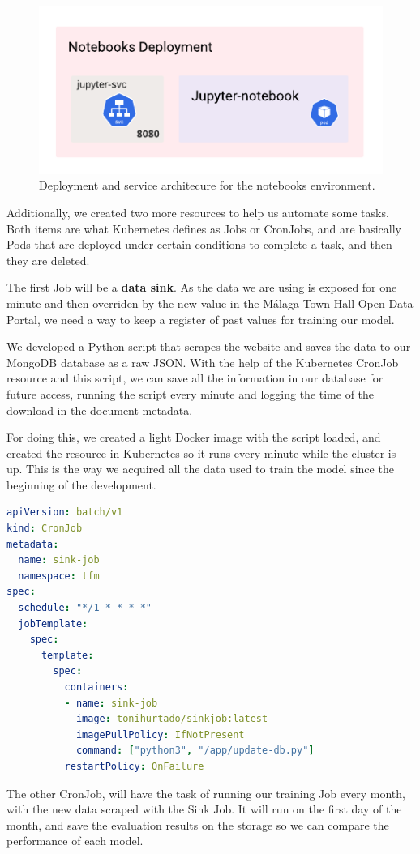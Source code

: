 \begin{figure}[H]
	\centering
	\includegraphics[width=0.6\linewidth]{imagenes/diagram-jupyter.png}
	\caption{Deployment and service architecure for the notebooks environment.}
	\label{diagram-jupyter}
\end{figure}

Additionally, we created two more resources to help us automate some tasks. Both items are what Kubernetes defines as Jobs or CronJobs, and are basically Pods that are deployed under certain conditions to complete a task, and then they are deleted.

The first Job will be a \textbf{data sink}. As the data we are using is exposed for one minute and then overriden by the new value in the Málaga Town Hall Open Data Portal, we need a way to keep a register of past values for training our model. 

We developed a Python script that scrapes the website and saves the data to our MongoDB database as a raw JSON. With the help of the Kubernetes CronJob resource and this script, we can save all the information in our database for future access, running the script every minute and logging the time of the download in the document metadata. 

For doing this, we created a light Docker image with the script loaded, and created the resource in Kubernetes so it runs every minute while the cluster is up. This is the way we acquired all the data used to train the model since the beginning of the development.

\begin{lstlisting}[language=yaml,caption=Kubernetes YAML definition file for the sink CronJob]
apiVersion: batch/v1
kind: CronJob
metadata:
  name: sink-job
  namespace: tfm
spec:
  schedule: "*/1 * * * *"
  jobTemplate:
    spec:
      template:
        spec:
          containers:
          - name: sink-job
            image: tonihurtado/sinkjob:latest
            imagePullPolicy: IfNotPresent
            command: ["python3", "/app/update-db.py"]
          restartPolicy: OnFailure
\end{lstlisting}
\label{section:Add}

The other CronJob, will have the task of running our training Job every month, with the new data scraped with the Sink Job. It will run on the first day of the month, and save the evaluation results on the storage so we can compare the performance of each model.


